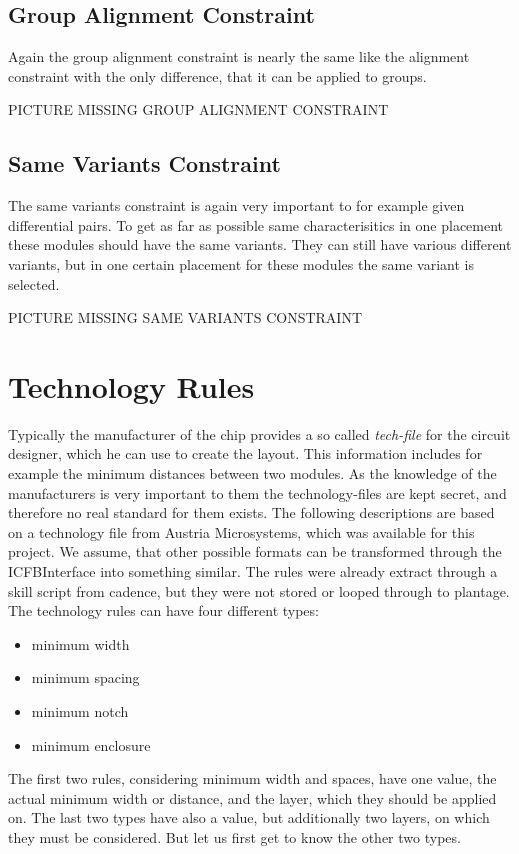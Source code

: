 \subsection{Group Alignment Constraint}
Again the group alignment constraint is nearly the same like the alignment constraint with the only difference, that it can be applied to groups.

PICTURE MISSING GROUP ALIGNMENT CONSTRAINT

\subsection{Same Variants Constraint}
The same variants constraint is again very important to for example given differential pairs. To get as far as possible same characterisitics in one placement these modules should have the same variants. They can still have various different variants, but in one certain placement for these modules the same variant is selected.

PICTURE MISSING SAME VARIANTS CONSTRAINT

\section{Technology Rules}
Typically the manufacturer of the chip provides a so called \textit{tech-file} for the circuit designer, which he can use to create the layout. This information includes for example the minimum distances between two modules. As the knowledge of the manufacturers is very important to them the technology-files are kept secret, and therefore no real standard for them exists. The following descriptions are based on a technology file from Austria Microsystems, which was available for this project. We assume, that other possible formats can be transformed through the ICFBInterface into something similar. The rules were already extract through a skill script from cadence, but they were not stored or looped through to plantage. The technology rules can have four different types:

\begin{itemize}
\item minimum width
\item minimum spacing
\item minimum notch
\item minimum enclosure
\end{itemize}

The first two rules, considering minimum width and spaces, have one value, the actual minimum width or distance, and the layer, which they should be applied on. The last two types have also a value, but additionally two layers, on which they must be considered. But let us first get to know the other two types.

